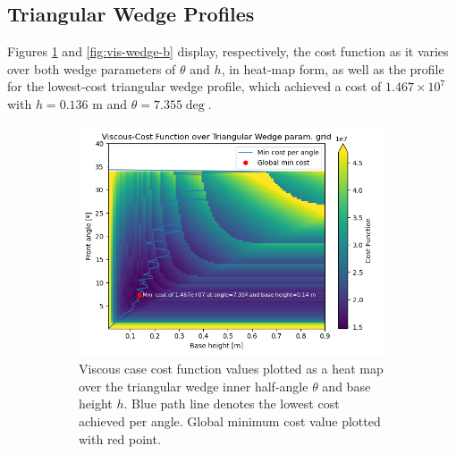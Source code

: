 \documentclass[11pt]{article}
\begin{document}
\subsection{Triangular Wedge Profiles}
Figures \ref{fig:vis-wedge-a} and \ref{fig:vis-wedge-b} display, respectively, the cost function as it varies over both wedge parameters of $\theta$ and $h$, in heat-map form, as well as the profile for the lowest-cost triangular wedge profile, which achieved a cost of $1.467 \times 10^7$ with $h=0.136 \text{ m}$ and $\theta=7.355\deg$.
\begin{figure}[H]
\centering
\begin{subfigure}[b]{0.54\textwidth}
    \centering
    \includegraphics[width=\linewidth]{../results/viscous/wedges.png}
    \caption{Viscous case cost function values plotted as a heat map over the triangular wedge inner half-angle $\theta$ and base height $h$. Blue path line denotes the lowest cost achieved per angle. Global minimum cost value plotted with red point.}
    \label{fig:vis-wedge-a}
\end{subfigure}
\hfill
\begin{subfigure}[b]{0.44\textwidth}
    \centering

\end{subfigure}
\end{figure}
\end{document}

